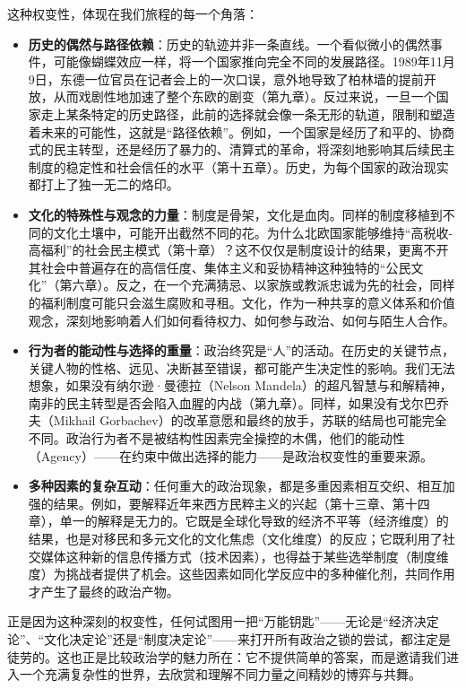 这种权变性，体现在我们旅程的每一个角落：
\begin{itemize}
    \item \textbf{历史的偶然与路径依赖}：历史的轨迹并非一条直线。一个看似微小的偶然事件，可能像蝴蝶效应一样，将一个国家推向完全不同的发展路径。1989年11月9日，东德一位官员在记者会上的一次口误，意外地导致了柏林墙的提前开放，从而戏剧性地加速了整个东欧的剧变（第九章）。反过来说，一旦一个国家走上某条特定的历史路径，此前的选择就会像一条无形的轨道，限制和塑造着未来的可能性，这就是“路径依赖”。例如，一个国家是经历了和平的、协商式的民主转型，还是经历了暴力的、清算式的革命，将深刻地影响其后续民主制度的稳定性和社会信任的水平（第十五章）。历史，为每个国家的政治现实都打上了独一无二的烙印。
    \item \textbf{文化的特殊性与观念的力量}：制度是骨架，文化是血肉。同样的制度移植到不同的文化土壤中，可能开出截然不同的花。为什么北欧国家能够维持“高税收-高福利”的社会民主模式（第十章）？这不仅仅是制度设计的结果，更离不开其社会中普遍存在的高信任度、集体主义和妥协精神这种独特的“公民文化”（第六章）。反之，在一个充满猜忌、以家族或教派忠诚为先的社会，同样的福利制度可能只会滋生腐败和寻租。文化，作为一种共享的意义体系和价值观念，深刻地影响着人们如何看待权力、如何参与政治、如何与陌生人合作。
    \item \textbf{行为者的能动性与选择的重量}：政治终究是“人”的活动。在历史的关键节点，关键人物的性格、远见、决断甚至错误，都可能产生决定性的影响。我们无法想象，如果没有纳尔逊·曼德拉（Nelson Mandela）的超凡智慧与和解精神，南非的民主转型是否会陷入血腥的内战（第九章）。同样，如果没有戈尔巴乔夫（Mikhail Gorbachev）的改革意愿和最终的放手，苏联的结局也可能完全不同。政治行为者不是被结构性因素完全操控的木偶，他们的能动性（Agency）——在约束中做出选择的能力——是政治权变性的重要来源。
    \item \textbf{多种因素的复杂互动}：任何重大的政治现象，都是多重因素相互交织、相互加强的结果。例如，要解释近年来西方民粹主义的兴起（第十三章、第十四章），单一的解释是无力的。它既是全球化导致的经济不平等（经济维度）的结果，也是对移民和多元文化的文化焦虑（文化维度）的反应；它既利用了社交媒体这种新的信息传播方式（技术因素），也得益于某些选举制度（制度维度）为挑战者提供了机会。这些因素如同化学反应中的多种催化剂，共同作用才产生了最终的政治产物。
\end{itemize}
正是因为这种深刻的权变性，任何试图用一把“万能钥匙”——无论是“经济决定论”、“文化决定论”还是“制度决定论”——来打开所有政治之锁的尝试，都注定是徒劳的。这也正是比较政治学的魅力所在：它不提供简单的答案，而是邀请我们进入一个充满复杂性的世界，去欣赏和理解不同力量之间精妙的博弈与共舞。

